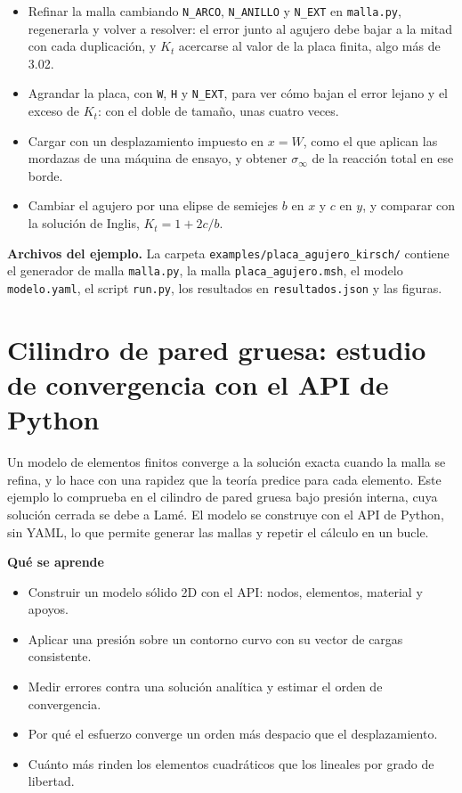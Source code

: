\documentclass[11pt,oneside]{report}
\renewcommand{\chaptermark}[1]{\markboth{Cap.\ \thechapter\ ---\ #1}{}}
\begin{document}
\begin{itemize}
  \item Refinar la malla cambiando \texttt{N\_ARCO}, \texttt{N\_ANILLO} y \texttt{N\_EXT} en \texttt{malla.py}, regenerarla y volver a resolver: el error junto al agujero debe bajar a la mitad con cada duplicación, y $K_t$ acercarse al valor de la placa finita, algo más de 3.02.
  \item Agrandar la placa, con \texttt{W}, \texttt{H} y \texttt{N\_EXT}, para ver cómo bajan el error lejano y el exceso de $K_t$: con el doble de tamaño, unas cuatro veces.
  \item Cargar con un desplazamiento impuesto en $x = W$, como el que aplican las mordazas de una máquina de ensayo, y obtener $\sigma_\infty$ de la reacción total en ese borde.
  \item Cambiar el agujero por una elipse de semiejes $b$ en $x$ y $c$ en $y$, y comparar con la solución de Inglis, $K_t = 1 + 2c/b$.
\end{itemize}

\textbf{Archivos del ejemplo.} La carpeta \texttt{examples/\allowbreak{}placa\_\allowbreak{}agujero\_\allowbreak{}kirsch/\allowbreak{}} contiene el generador de malla \texttt{malla.py}, la malla \texttt{placa\_\allowbreak{}agujero.\allowbreak{}msh}, el modelo \texttt{modelo.yaml}, el script \texttt{run.py}, los resultados en \texttt{resultados.json} y las figuras.


\newpage

\chapter{Cilindro de pared gruesa: estudio de convergencia con el API de Python}
\chaptermark{Cilindro de pared gruesa}
\label{cap:cilindro_lame}





Un modelo de elementos finitos converge a la solución exacta cuando la malla se refina, y lo hace con una rapidez que la teoría predice para cada elemento. Este ejemplo lo comprueba en el cilindro de pared gruesa bajo presión interna, cuya solución cerrada se debe a Lamé. El modelo se construye con el API de Python, sin YAML, lo que permite generar las mallas y repetir el cálculo en un bucle.

\textbf{Qué se aprende}

\begin{itemize}
  \item Construir un modelo sólido 2D con el API: nodos, elementos, material y apoyos.
  \item Aplicar una presión sobre un contorno curvo con su vector de cargas consistente.
  \item Medir errores contra una solución analítica y estimar el orden de convergencia.
  \item Por qué el esfuerzo converge un orden más despacio que el desplazamiento.
  \item Cuánto más rinden los elementos cuadráticos que los lineales por grado de libertad.
\end{itemize}
\end{document}
